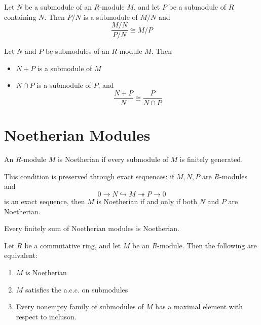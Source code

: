 \documentclass[12pt, a4paper, oneside, openright, titlepage]{book}
\begin{document}
\begin{prop}
    Let $N$ be a submodule of an $R$-module $M$, and let $P$ be a submodule of $R$ containing $N$. Then $P/N$ is a submodule of $M/N$ and \begin{equation*}
        \frac{M/N}{P/N}\cong M/P
    \end{equation*}
\end{prop}

\begin{prop}
    Let $N$ and $P$ be submodules of an $R$-module $M$. Then \begin{itemize}
        \item $N+P$ is a submodule of $M$
        \item $N \cap P$ is a submodule of $P$, and \begin{equation*}
                \frac{N+P}{N}\cong \frac{P}{N\cap P}
        \end{equation*}
    \end{itemize}
\end{prop}


\section{Noetherian Modules}

\begin{defn}
    An $R$-module $M$ is Noetherian if every submodule of $M$ is finitely generated.
\end{defn}

This condition is preserved through exact sequences: if $M,N,P$ are $R$-modules and $$0\rightarrow N\hookrightarrow M\twoheadrightarrow P \rightarrow 0$$
is an exact sequence, then $M$ is Noetherian if and only if both $N$ and $P$ are Noetherian.

\begin{cor}
    Every finitely sum of Noetherian modules is Noetherian.
\end{cor}

\begin{prop}
    Let $R$ be a commutative ring, and let $M$ be an $R$-module. Then the following are equivalent: \begin{enumerate}
        \item $M$ is Noetherian
        \item $M$ satisfies the a.c.c. on submodules
        \item Every nonempty family of submodules of $M$ has a maximal element with respect to incluson.
    \end{enumerate}
\end{prop}
\end{document}
